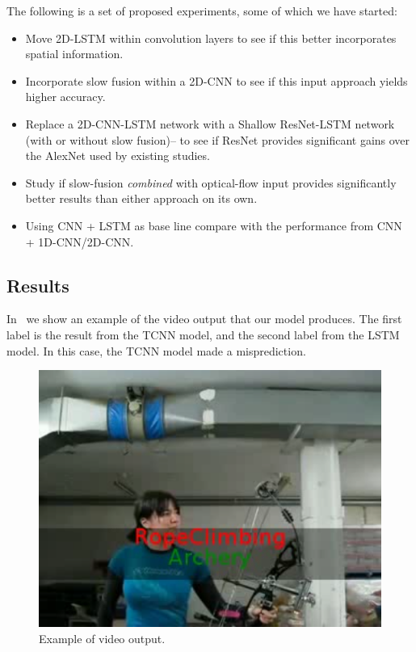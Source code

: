 The following is a set of proposed experiments, some of which we have started:
\begin{itemize}
\item Move 2D-LSTM within convolution layers to see if this better incorporates spatial information.
\item Incorporate slow fusion within a 2D-CNN to see if this input approach yields higher accuracy.
\item Replace a 2D-CNN-LSTM network with a Shallow ResNet-LSTM network (with or without slow fusion)-- to see if ResNet provides significant gains over the AlexNet used by existing studies.
\item Study if slow-fusion \emph{combined} with optical-flow input provides significantly better results than either approach on its own.
\item Using CNN + LSTM as base line compare with the performance from CNN + 1D-CNN/2D-CNN.

\end{itemize}

\subsection{Results}
In~ we show an example of the video output that our model produces. The first label is the result from the TCNN model, and the second label from the LSTM model. In this case, the TCNN model made a misprediction. 
\begin{figure}
  \centering
  \includegraphics[width=0.8\linewidth]{figs/demo}
  \caption{Example of video output.}
  \label{fig:demo}
\end{figure}


